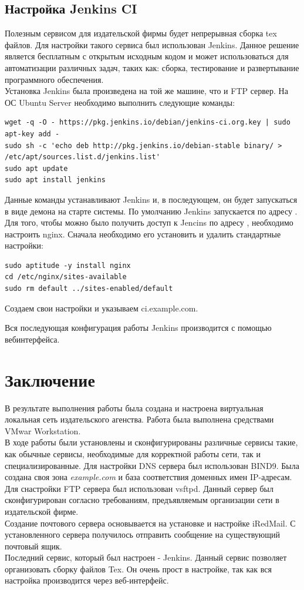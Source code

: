 \subsection{Настройка Jenkins CI}
Полезным сервисом для издательской фирмы будет непрерывная сборка tex файлов. Для настройки такого сервиса был использован Jenkins. Данное решение является бесплатным с открытым исходным кодом и может использоваться для автоматизации различных задач, таких как: сборка, тестирование и развертывание программного обеспечения.
\\Установка Jenkins была произведена на той же машине, что и FTP сервер. На ОС Ubuntu Server необходимо выполнить следующие команды:
\begin{lstlisting}
wget -q -O - https://pkg.jenkins.io/debian/jenkins-ci.org.key | sudo apt-key add -
sudo sh -c 'echo deb http://pkg.jenkins.io/debian-stable binary/ > /etc/apt/sources.list.d/jenkins.list'
sudo apt update
sudo apt install jenkins
\end{lstlisting}
Данные команды устанавливают Jenkins и, в последующем, он будет запускаться в виде демона на старте системы. По умолчанию Jenkins запускается по адресу . Для того, чтобы можно было получить доступ к Jencins по адресу , необходимо настроить nginx. Сначала необходимо его установить и удалить стандартные настройки:
\begin{lstlisting}
sudo aptitude -y install nginx
cd /etc/nginx/sites-available
sudo rm default ../sites-enabled/default
\end{lstlisting}

Создаем свои настройки и указываем ci.example.com.


Вся последующая конфигурация работы Jenkins производится с помощью вебинтерфейса.

\section*{Заключение}
В результате выполнения работы была создана и настроена виртуальная локальная сеть издательского агенства. Работа была выполнена средствами VMwar Workstation. \\
В ходе работы были установлены и сконфигурированы различные сервисы такие, как обычные сервисы, необходимые для корректной работы сети, так и специализированные. 
Для настройки DNS сервера был использован BIND9. Была создана своя зона \textit{example.com} и база соответствия доменных имен IP-адресам. \\
Для снастройки FTP сервера был использован vsftpd. Данный сервер был сконфигурирован согласно требованиям, предъявляемым организации сети в издательской фирме. \\
Создание почтового сервера основывается на установке и настройке iRedMail. С установленного сервера получилось отправить сообщение на существующий почтовый ящик. \\
Последний сервис, который был настроен - Jenkins. Данный сервис позволяет организовать сборку файлов Tex. Он очень прост в настройке, так как вся настройка производится через веб-интерфейс.


